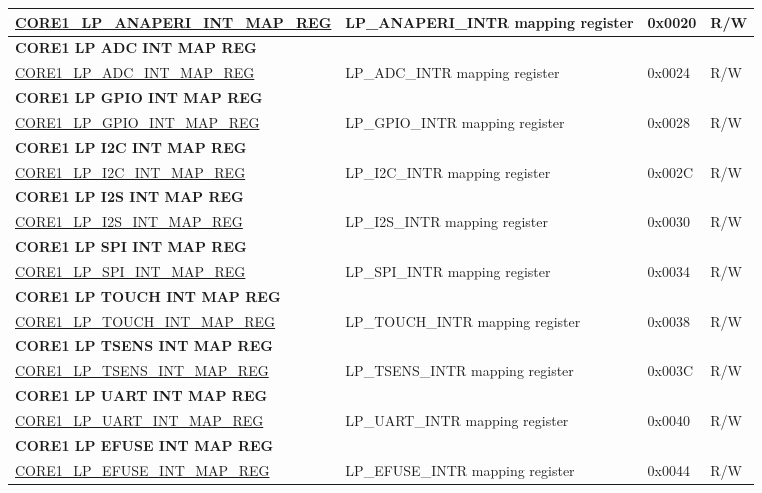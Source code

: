 \begin{longtable}{ | p{7.5cm} | p{7.2cm} | p{1.3cm} | p{1cm} | }
\hyperref[regdesc:CORE1LPANAPERIINTMAPREG]{CORE1\_LP\_ANAPERI\_INT\_MAP\_REG} & LP\_ANAPERI\_INTR mapping register & 0x0020 & R/W \\ \hline
\multicolumn{4}{|l|}{\textbf{CORE1 LP ADC INT MAP REG}} \\ \hline
\hyperref[regdesc:CORE1LPADCINTMAPREG]{CORE1\_LP\_ADC\_INT\_MAP\_REG} & LP\_ADC\_INTR mapping register & 0x0024 & R/W \\ \hline
\multicolumn{4}{|l|}{\textbf{CORE1 LP GPIO INT MAP REG}} \\ \hline
\hyperref[regdesc:CORE1LPGPIOINTMAPREG]{CORE1\_LP\_GPIO\_INT\_MAP\_REG} & LP\_GPIO\_INTR mapping register & 0x0028 & R/W \\ \hline
\multicolumn{4}{|l|}{\textbf{CORE1 LP I2C INT MAP REG}} \\ \hline
\hyperref[regdesc:CORE1LPI2CINTMAPREG]{CORE1\_LP\_I2C\_INT\_MAP\_REG} & LP\_I2C\_INTR mapping register & 0x002C & R/W \\ \hline
\multicolumn{4}{|l|}{\textbf{CORE1 LP I2S INT MAP REG}} \\ \hline
\hyperref[regdesc:CORE1LPI2SINTMAPREG]{CORE1\_LP\_I2S\_INT\_MAP\_REG} & LP\_I2S\_INTR mapping register & 0x0030 & R/W \\ \hline
\multicolumn{4}{|l|}{\textbf{CORE1 LP SPI INT MAP REG}} \\ \hline
\hyperref[regdesc:CORE1LPSPIINTMAPREG]{CORE1\_LP\_SPI\_INT\_MAP\_REG} & LP\_SPI\_INTR mapping register & 0x0034 & R/W \\ \hline
\multicolumn{4}{|l|}{\textbf{CORE1 LP TOUCH INT MAP REG}} \\ \hline
\hyperref[regdesc:CORE1LPTOUCHINTMAPREG]{CORE1\_LP\_TOUCH\_INT\_MAP\_REG} & LP\_TOUCH\_INTR mapping register & 0x0038 & R/W \\ \hline
\multicolumn{4}{|l|}{\textbf{CORE1 LP TSENS INT MAP REG}} \\ \hline
\hyperref[regdesc:CORE1LPTSENSINTMAPREG]{CORE1\_LP\_TSENS\_INT\_MAP\_REG} & LP\_TSENS\_INTR mapping register & 0x003C & R/W \\ \hline
\multicolumn{4}{|l|}{\textbf{CORE1 LP UART INT MAP REG}} \\ \hline
\hyperref[regdesc:CORE1LPUARTINTMAPREG]{CORE1\_LP\_UART\_INT\_MAP\_REG} & LP\_UART\_INTR mapping register & 0x0040 & R/W \\ \hline
\multicolumn{4}{|l|}{\textbf{CORE1 LP EFUSE INT MAP REG}} \\ \hline
\hyperref[regdesc:CORE1LPEFUSEINTMAPREG]{CORE1\_LP\_EFUSE\_INT\_MAP\_REG} & LP\_EFUSE\_INTR mapping register & 0x0044 & R/W \\ \hline

\end{longtable}
